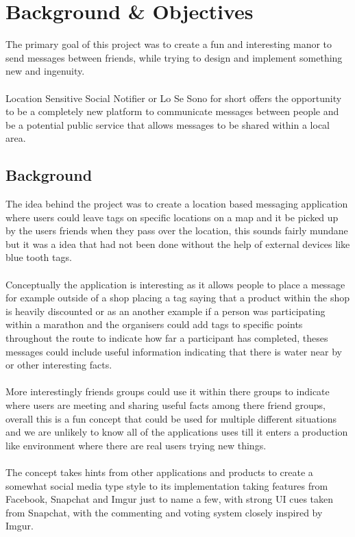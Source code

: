 \chapter{Background \& Objectives}

The primary goal of this project was to create a fun and interesting manor to send messages between friends, while trying to design and implement something new and ingenuity.\\
\\
Location Sensitive Social Notifier or Lo Se Sono for short offers the opportunity to be a completely new platform to communicate messages between people and be a potential public service that allows messages to be shared within a local area.

\section{Background}

The idea behind the project was to create a location based messaging application where users could leave tags on specific locations on a map and it be picked up by the users friends when they pass over the location, this sounds fairly mundane but it was a idea that had not been done without the help of external devices like blue tooth tags.\\
\\
Conceptually the application is interesting as it allows people to place a message for example outside of a shop placing a tag saying that a product within the shop is heavily discounted or as an another example if a person was participating within a marathon and the organisers could add tags to specific points throughout the route to indicate how far a participant has completed, theses messages could include useful information indicating that there is water near by or other interesting facts.\\
\\
More interestingly friends groups could use it within there groups to indicate where users are meeting and sharing useful facts among there friend groups, overall this is a fun concept that could be used for multiple different situations and we are unlikely to know all of the applications uses till it enters a production like environment where there are real users trying new things.\\
\\
The concept takes hints from other applications and products to create a somewhat social media type style to its implementation taking features from Facebook, Snapchat and Imgur just to name a few, with strong UI cues taken from Snapchat, with the commenting and voting system closely inspired by Imgur.

